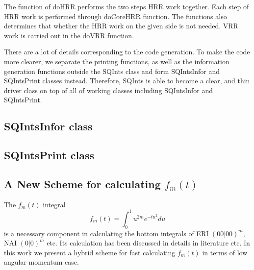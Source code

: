 The function of doHRR performs the two steps HRR work together. Each step of HRR 
work is performed through doCoreHRR function. The functions also determines that 
whether the HRR work on the given side is not needed. VRR work is carried out 
in the doVRR function.

There are a lot of details corresponding to the code generation. To make the 
code more clearer, we separate the printing functions, as well as the information
generation functions outside the SQInts class and form SQIntsInfor and SQIntsPrint
classes instead. Therefore, SQInts is able to become a clear, and thin driver
class on top of all of working classes including SQIntsInfor and SQIntsPrint.

\subsection{SQIntsInfor class}

\subsection{SQIntsPrint class}

\subsection{A New Scheme for calculating $f_{m}(t)$}
\label{fmt}

The $f_{m}(t)$ integral
\begin{equation}\label{fm_ssssm_fmt_eq:1}
 f_{m}(t) = \int^{1}_{0} u^{2m} e^{-tu^{2}} du 
\end{equation}
is a necessary component in calculating the bottom integrals of ERI $(00|00)^{m}$,
NAI $(0|0)^{m}$ etc. Its calculation has been discussed in details in literature
\cite{harris1983sssm, gill1991two} etc. In this work we present a hybrid scheme 
for fast calculating $f_{m}(t)$ in terms of low angular momentum case.

